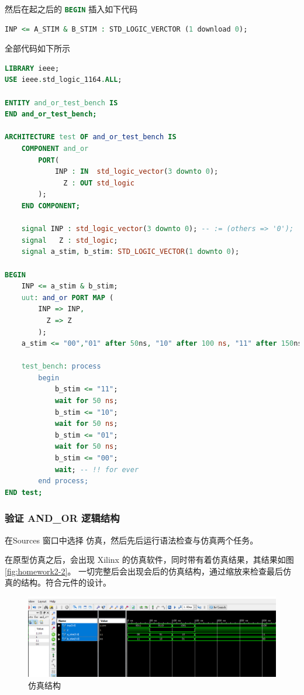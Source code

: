 \documentclass{ctexart}
\begin{document}
然后在起之后的 \lstinline[language=VHDL]|BEGIN| 插入如下代码
\begin{lstlisting}[language=VHDL]
INP <= A_STIM & B_STIM : STD_LOGIC_VERCTOR (1 download 0);
\end{lstlisting}

全部代码如下所示
\begin{lstlisting}[language=VHDL]
LIBRARY ieee;
USE ieee.std_logic_1164.ALL;

ENTITY and_or_test_bench IS
END and_or_test_bench;

ARCHITECTURE test OF and_or_test_bench IS 
    COMPONENT and_or
        PORT(
            INP : IN  std_logic_vector(3 downto 0);
              Z : OUT std_logic
        );
    END COMPONENT;

    signal INP : std_logic_vector(3 downto 0); -- := (others => '0');
    signal   Z : std_logic;
    signal a_stim, b_stim: STD_LOGIC_VECTOR(1 downto 0);

BEGIN
    INP <= a_stim & b_stim;
    uut: and_or PORT MAP (
        INP => INP,
          Z => Z
        );
    a_stim <= "00","01" after 50ns, "10" after 100 ns, "11" after 150ns;

    test_bench: process
        begin
            b_stim <= "11";
            wait for 50 ns;
            b_stim <= "10";
            wait for 50 ns;
            b_stim <= "01";
            wait for 50 ns;
            b_stim <= "00";
            wait; -- !! for ever
        end process;
END test;

\end{lstlisting}

\subsubsection{验证 AND\_OR 逻辑结构}

在Sources 窗口中选择 仿真，然后先后运行语法检查与仿真两个任务。

在原型仿真之后，会出现 Xilinx 的仿真软件，同时带有着仿真结果，其结果如图 \ref{fig:homework2-2}。
一切完整后会出现会后的仿真结构，通过缩放来检查最后仿真的结构。符合元件的设计。

\begin{figure}
\centering
\includegraphics[width=0.7\linewidth]{homework2-2}
\caption{仿真结构}
\label{fig:report3-5}
\end{figure}
\end{document}
